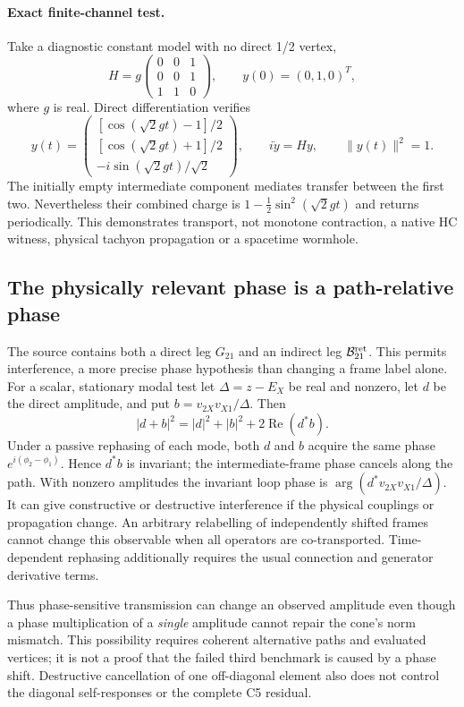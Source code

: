 \documentclass[11pt,a4paper]{article}
\begin{document}
\paragraph{Exact finite-channel test.}
Take a diagnostic constant model with no direct 1/2 vertex,
\[
 H=g\begin{pmatrix}0&0&1\\0&0&1\\1&1&0\end{pmatrix},
 \qquad y(0)=(0,1,0)^T,
\]
where $g$ is real. Direct differentiation verifies
\[
 y(t)=\begin{pmatrix}
 [\cos(\sqrt2gt)-1]/2\\
 [\cos(\sqrt2gt)+1]/2\\
 -i\sin(\sqrt2gt)/\sqrt2
 \end{pmatrix},\qquad i\dot y=Hy,\qquad\|y(t)\|^2=1.
\]
The initially empty intermediate component mediates transfer
between the first two. Nevertheless their combined charge is
$1-\tfrac12\sin^2(\sqrt2gt)$ and returns periodically. This
demonstrates transport, not monotone contraction, a native HC
witness, physical tachyon propagation or a spacetime wormhole.

\subsection{The physically relevant phase is a path-relative phase}

The source contains both a direct leg $G_{21}$ and an indirect
leg $\mathcal B_{21}^{\rm ret}$. This permits interference, a
more precise phase hypothesis than changing a frame label alone.
For a scalar, stationary modal test let $\Delta=z-E_X$ be real
and nonzero, let $d$ be the direct amplitude, and put
$b=v_{2X}v_{X1}/\Delta$. Then
\[
 |d+b|^2=|d|^2+|b|^2+2\operatorname{Re}(d^*b).
\]
Under a passive rephasing of each mode, both $d$ and $b$ acquire
the same phase $e^{i(\phi_2-\phi_1)}$. Hence $d^*b$ is invariant;
the intermediate-frame phase cancels along the path. With nonzero
amplitudes the invariant loop phase is
$\arg(d^*v_{2X}v_{X1}/\Delta)$. It can give constructive or
destructive interference if the physical couplings or propagation
change. An arbitrary relabelling of independently shifted frames
cannot change this observable when all operators are co-transported.
Time-dependent rephasing additionally requires the usual connection
and generator derivative terms.

Thus phase-sensitive transmission can change an observed amplitude
even though a phase multiplication of a \emph{single} amplitude
cannot repair the cone's norm mismatch. This possibility requires
coherent alternative paths and evaluated vertices; it is not a
proof that the failed third benchmark is caused by a phase shift.
Destructive cancellation of one off-diagonal element also does not
control the diagonal self-responses or the complete C5 residual.
\end{document}
